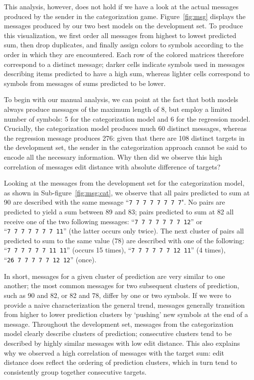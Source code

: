 \documentclass[twocolumn]{article}
\begin{document}
This analysis, however, does not hold if we have a look at the actual messages produced by the sender in the categorization game.
Figure~\ref{fig:msg} displays the messages produced by our two best models on the development set. 
To produce this visualization, we first order all messages from highest to lowest predicted sum, then drop duplicates, and finally assign colors to symbols according to the order in which they are encountered.
Each row of the colored matrices therefore correspond to a distinct message; darker cells indicate symbols used in messages describing items predicted to have a high sum, whereas lighter cells correspond to symbols from messages of sums predicted to be lower.

To begin with our manual analysis, we can point at the fact that both models always produce messages of the maximum length  of 8, but employ a limited number of symbols: 5 for the categorization model and 6 for the regression model.
Crucially, the categorization model produces much 60 distinct messages, whereas the regression message produces 276: given that there are 108 distinct targets in the development set, the sender in the categorization approach cannot be said to encode all the necessary information. 
Why then did we observe this high correlation of messages edit distance with absolute difference of targets?

Looking at the messages from the development set for the categorization model, as shown in Sub-figure~\ref{fig:msg:cat}, we observe that all pairs predicted to sum at 90 are described with the same message ``\textcolor{Blues-K}{\tt 7~7~7~7~7~7~7~7}". %
No pairs are predicted to yield a sum between 89 and 83; pairs predicted to sum at 82 all receive one of the two following messages: ``{\tt \textcolor{Blues-K}{7~7~7~7~7~7~7}~\textcolor{Blues-I}{12}}'' or ``{\tt \textcolor{Blues-K}{7~7~7~7~7~7~7}~\textcolor{Blues-G}{11}}'' (the latter occurs only twice).
The next cluster of pairs all predicted to sum to the same value (78) are described with one of the following: ``{\tt \textcolor{Blues-K}{7~7~7~7~7~7}~\textcolor{Blues-G}{11~11}}'' (occurs 15 times), ``{\tt \textcolor{Blues-K}{7~7~7~7~7~7}~\textcolor{Blues-I}{12}~\textcolor{Blues-G}{11}}'' (4 times),  ``{\tt \textcolor{Blues-F}{26}~\textcolor{Blues-K}{7~7~7~7~7}~\textcolor{Blues-I}{12~12}}'' (once).

In short, messages for a given cluster of prediction are very similar to one another; the most common messages for two subsequent clusters of prediction, such as 90 and 82, or 82 and 78, differ by one or two symbols.
If we were to provide a naive characterization the general trend, messages generally transition from higher to lower prediction clusters by `pushing' new symbols at the end of a message.
Throughout the development set, messages from the categorization model clearly describe clusters of prediction; consecutive clusters tend to be described by highly similar messages with low edit distance.
This also explains why we observed a high correlation of messages with the target sum: edit distance does reflect the ordering of prediction clusters, which in turn tend to consistently group together consecutive targets.
\end{document}
